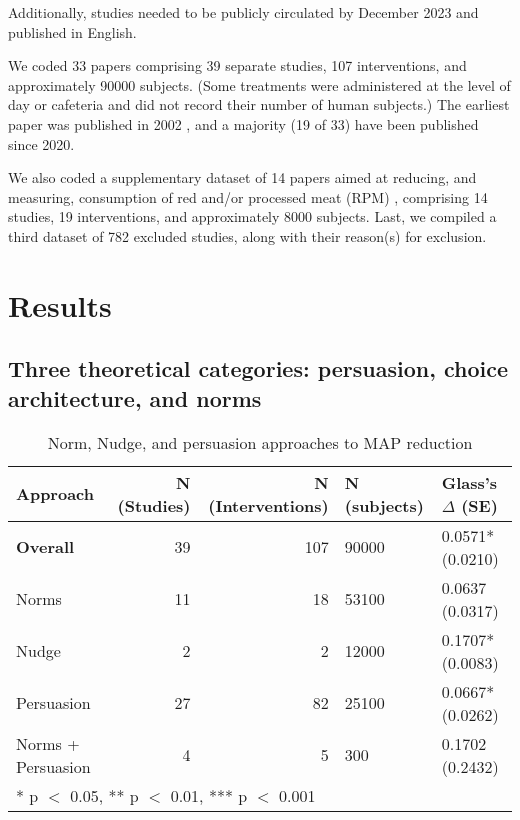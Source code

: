 \documentclass[sn-nature,pdflatex]{sn-jnl}
\begin{document}
Additionally, studies needed to be publicly circulated by December 2023
and published in English.

We coded 33 papers
\citep{aldoh2023, allen2002, alblas2023, coker2022, griesoph2021, piester2020, sparkman2017, sparkman2020, andersson2021, kanchanachitra2020, bochmann2017, bschaden2020, cooney2016, feltz2022, haile2021, mathur2021effectiveness, peacock2017, polanco2022, sparkman2021, abrahamse2007, acharya2004, berndsen2005, bertolaso2015, bianchi2022, fehrenbach2015, hatami2018, jalil2023, merrill2009, norris2014, weingarten2022, carfora2023, hennessy2016, mattson2020}
comprising 39 separate studies, 107 interventions, and approximately
90000 subjects. (Some treatments were administered at the level of day
or cafeteria and did not record their number of human subjects.) The
earliest paper was published in 2002 \citep{allen2002}, and a majority
(19 of 33) have been published since 2020.

We also coded a supplementary dataset of 14 papers aimed at reducing,
and measuring, consumption of red and/or processed meat (RPM)
\citep{carfora2017correlational, carfora2017randomised, carfora2019, carfora2019informational, delichatsios2001, dijkstra2022, emmons2005cancer, emmons2005project, jaacks2014, james2015, lee2018, perino2022, schatzkin2000, sorensen2005},
comprising 14 studies, 19 interventions, and approximately 8000
subjects. Last, we compiled a third dataset of 782 excluded studies,
along with their reason(s) for exclusion.

\section{Results}\label{sec2}

\subsection{Three theoretical categories: persuasion, choice
architecture, and norms}\label{sec2.1}

\begin{table}[!h]
\centering
\caption{\label{tab:tab:table_one}Norm, Nudge, and persuasion approaches to MAP reduction}
\centering
\begin{tabular}[t]{lrrll}
\toprule
Approach & N (Studies) & N (Interventions) & N (subjects) & Glass's $\Delta$ (SE)\\
\midrule
\textbf{Overall} & 39 & 107 & 90000 & 0.0571* (0.0210)\\
Norms & 11 & 18 & 53100 & 0.0637 (0.0317)\\
Nudge & 2 & 2 & 12000 & 0.1707* (0.0083)\\
Persuasion & 27 & 82 & 25100 & 0.0667* (0.0262)\\
Norms + Persuasion & 4 & 5 & 300 & 0.1702 (0.2432)\\
\bottomrule
\multicolumn{5}{l}{\rule{0pt}{1em}* p $<$ 0.05, ** p $<$ 0.01, *** p $<$ 0.001}\\
\end{tabular}
\end{table}
\end{document}
